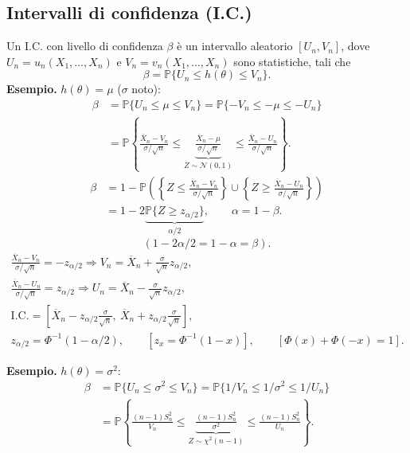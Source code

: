 \subsection*{Intervalli di confidenza (I.C.)}
Un I.C. con livello di confidenza $\beta$ è un intervallo aleatorio $[U_n,V_n]$, dove $U_n=u_n(X_1,\ldots,X_n)$ e $V_n=v_n(X_1,\ldots,X_n)$ sono statistiche, tali che
\[\boxed{\beta=\mathbb P\{U_n\le h(\theta)\le V_n\}}.\]
\textbf{Esempio.} $h(\theta)=\mu$ ($\sigma$ noto):
\begin{align*}
\beta&=\mathbb P\{U_n\le\mu\le V_n\}=\mathbb P\{-V_n\le-\mu\le-U_n\}\\
&=\mathbb P\left\{\frac{\overline X_n-V_n}{\sigma/\sqrt n}\le
\underbrace{\frac{\overline X_n-\mu}{\sigma/\sqrt n}}_{Z\sim\mathcal N(0,1)}\le\frac{\overline X_n-U_n}{\sigma/\sqrt n}\right\}.
\end{align*}
\begin{align*}
\beta&=1-\mathbb P\left(\left\{Z\le\frac{\overline X_n-V_n}{\sigma/\sqrt n}\right\}\cup
\left\{Z\ge\frac{\overline X_n-U_n}{\sigma/\sqrt n}\right\}\right)\\
&=1-2\underbrace{\mathbb P\{Z\ge z_{\alpha/2}\}}_{\alpha/2},\qquad\alpha=1-\beta.
\end{align*}
\[(1-2\alpha/2=1-\alpha=\beta).\]
\begin{gather*}
\frac{\overline X_n-V_n}{\sigma/\sqrt n}=-z_{\alpha/2}\Rightarrow V_n=\overline X_n+\frac\sigma{\sqrt n}z_{\alpha/2},\\
\frac{\overline X_n-U_n}{\sigma/\sqrt n}=z_{\alpha/2}\Rightarrow U_n=\overline X_n-\frac\sigma{\sqrt n}z_{\alpha/2},\\
\boxed{\mathrm{I.C.}=\left[\overline X_n-z_{\alpha/2}\frac\sigma{\sqrt n},\ \overline X_n+z_{\alpha/2}\frac\sigma{\sqrt n}\right]},\\
z_{\alpha/2}=\Phi^{-1}(1-\alpha/2),\qquad[z_x=\Phi^{-1}(1-x)],\qquad[\Phi(x)+\Phi(-x)=1].
\end{gather*}
\begin{center}\end{center}
\textbf{Esempio.} $h(\theta)=\sigma^2$:
\begin{align*}
\beta&=\mathbb P\{U_n\le\sigma^2\le V_n\}=\mathbb P\{1/V_n\le1/\sigma^2\le1/U_n\}\\
&=\mathbb P\left\{\frac{(n-1)S_n^2}{V_n}\le\underbrace{\frac{(n-1)S_n^2}{\sigma^2}}_{Z\sim\chi^2(n-1)}\le\frac{(n-1)S_n^2}{U_n}\right\}.
\end{align*}
